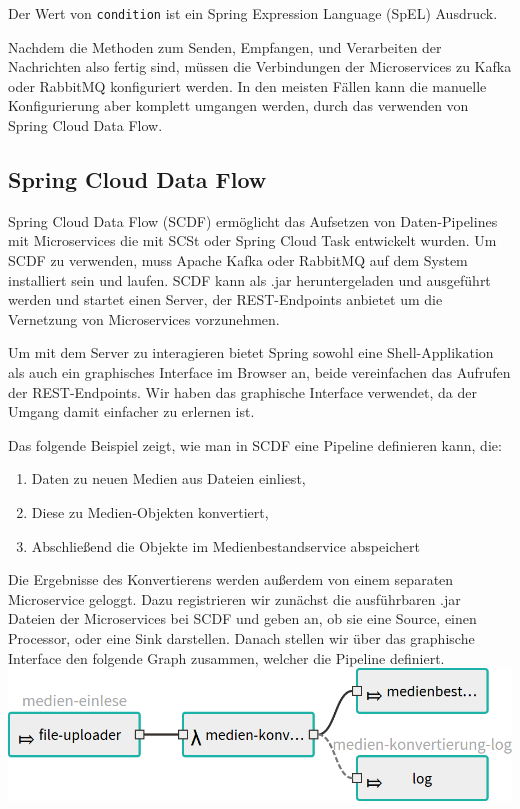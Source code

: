 \documentclass{article}
\begin{document}
Der Wert von \texttt{condition} ist ein Spring Expression Language (SpEL) Ausdruck.

Nachdem die Methoden zum Senden, Empfangen, und Verarbeiten der Nachrichten also fertig sind, müssen die Verbindungen der Microservices zu Kafka oder RabbitMQ konfiguriert werden.
In den meisten Fällen kann die manuelle Konfigurierung aber komplett umgangen werden, durch das verwenden von Spring Cloud Data Flow.

\subsection{Spring Cloud Data Flow}

Spring Cloud Data Flow (SCDF) ermöglicht das Aufsetzen von Daten-Pipelines mit Microservices die mit SCSt oder Spring Cloud Task entwickelt wurden.
Um SCDF zu verwenden, muss Apache Kafka oder RabbitMQ auf dem System installiert sein und laufen.
SCDF kann als .jar heruntergeladen und ausgeführt werden und startet einen Server, der REST-Endpoints anbietet um die Vernetzung von Microservices vorzunehmen.

Um mit dem Server zu interagieren bietet Spring sowohl eine Shell-Applikation als auch ein graphisches Interface im Browser an, beide vereinfachen das Aufrufen der REST-Endpoints.
Wir haben das graphische Interface verwendet, da der Umgang damit einfacher zu erlernen ist.

Das folgende Beispiel zeigt, wie man in SCDF eine Pipeline definieren kann, die:
\begin{enumerate}
\item Daten zu neuen Medien aus Dateien einliest,
\item Diese zu Medien-Objekten konvertiert,
\item Abschließend die Objekte im Medienbestandservice abspeichert
\end{enumerate}
Die Ergebnisse des Konvertierens werden außerdem von einem separaten Microservice geloggt.
Dazu registrieren wir zunächst die ausführbaren .jar Dateien der Microservices bei SCDF und geben an, ob sie eine Source, einen Processor, oder eine Sink darstellen.
Danach stellen wir über das graphische Interface den folgende Graph zusammen, welcher die Pipeline definiert.\medskip\\
\includegraphics[width=\textwidth]{stream-small.png}
\end{document}
